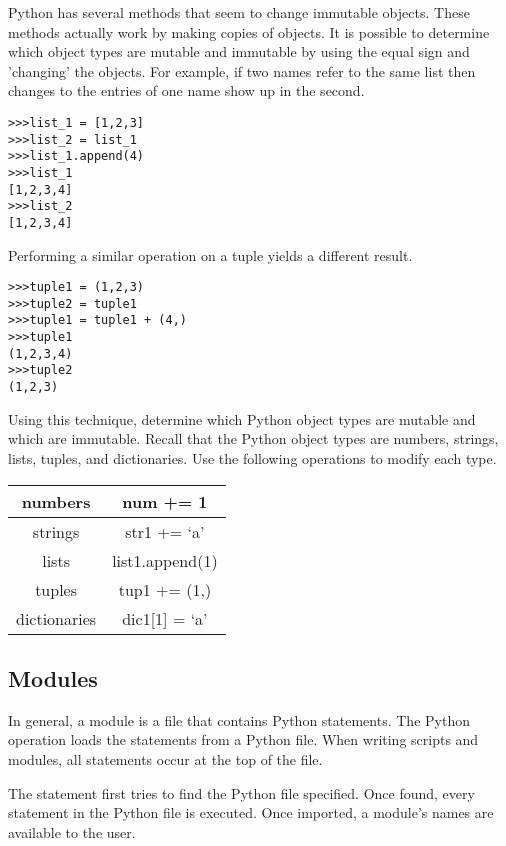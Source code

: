 \begin{problem}
Python has several methods that seem to change immutable objects.
These methods actually work by making copies of objects.
It is possible to determine which object types are mutable and immutable by using the equal sign and 'changing' the objects.
For example, if two names refer to the same list then changes to the entries of one name show up in the second.
\begin{lstlisting}
>>>list_1 = [1,2,3]
>>>list_2 = list_1
>>>list_1.append(4)
>>>list_1
[1,2,3,4]
>>>list_2
[1,2,3,4]
\end{lstlisting}

Performing a similar operation on a tuple yields a different result.
\begin{lstlisting}
>>>tuple1 = (1,2,3)
>>>tuple2 = tuple1
>>>tuple1 = tuple1 + (4,)
>>>tuple1
(1,2,3,4)
>>>tuple2
(1,2,3)
\end{lstlisting}

Using this technique, determine which Python object types are mutable and which are immutable.
Recall that the Python object types are numbers, strings, lists, tuples, and dictionaries.
Use the following operations to modify each type.
\begin{center}
\begin{tabular}{|c|c|}
\hline
numbers & num += 1 \\
\hline
strings & str1 += `a' \\
\hline
lists & list1.append(1) \\
\hline
tuples & tup1 += (1,) \\
\hline
dictionaries & dic1[1] = `a' \\
\hline
\end{tabular}
\end{center}
\end{problem}

\subsection*{Modules}

In general, a module is a file that contains Python statements.
The Python  operation loads the statements from a Python file.
When writing scripts and modules, all  statements occur at the top of the file.

The  statement first tries to find the Python file specified.
Once found, every statement in the Python file is executed.
Once imported, a module's names are available to the user.

